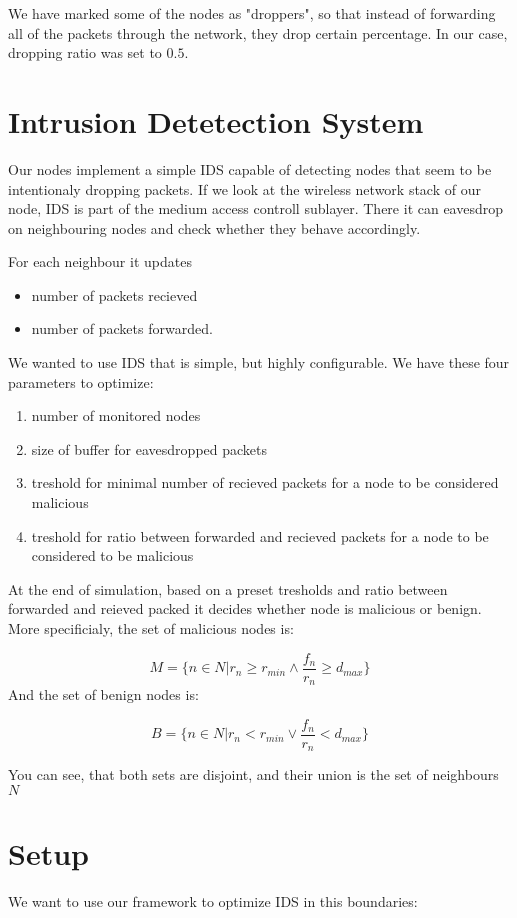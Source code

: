 \documentclass[12pt,oneside,draft]{fithesis2}
\begin{document}
We have marked some of the nodes as "droppers", so that instead of forwarding all of the packets through the network, they drop certain percentage. In our case, dropping ratio was set to $0.5$.

\section{Intrusion Detetection System}
Our nodes implement a simple IDS capable of detecting nodes that seem to be intentionaly dropping packets.
If we look at the wireless network stack of our node, IDS is part of the medium access controll sublayer.
There it can eavesdrop on neighbouring nodes and check whether they behave accordingly.

For each neighbour it updates 
\begin{itemize}
\item number of packets recieved 
\item number of packets forwarded.
\end{itemize}

We wanted to use IDS that is simple, but highly configurable. 
We have these four parameters to optimize:
\begin{enumerate}
\item number of monitored nodes
\item size of buffer for eavesdropped packets
\item treshold for minimal number of recieved packets for a node to be considered malicious
\item treshold for ratio between forwarded and recieved packets for a node to be considered to be malicious
\end{enumerate}
At the end of simulation, based on a preset tresholds and ratio between forwarded and reieved packed it decides whether node is malicious or benign. More specificialy, the set of malicious nodes is:

$$ M = \{n \in N|r_n \geq r_{min} \land \frac{f_n}{r_n} \geq d_{max} \} $$
And the set of benign nodes is:

$$B = \{n \in N|r_n < r_{min} \lor \frac{f_n}{r_n} < d_{max} \} $$

You can see, that both sets are disjoint, and their union is the set of neighbours $N$

\section{Setup}
We want to use our framework to optimize IDS in this boundaries:
\end{document}
